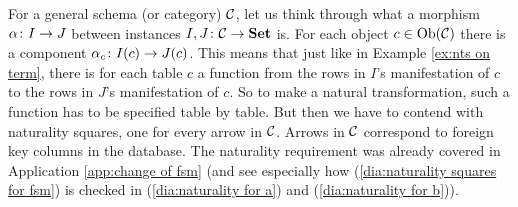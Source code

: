 \documentclass[CT4S-EN-RU]{subfiles}
\begin{document}
\begin{exerciseRUS}\label{exc:indexed sets as functors}
\end{exerciseRUS}

\begin{blockENG}
For a general schema (or category) $\mathcal{C}$, let us think through what a morphism $\alpha\colon I\rightarrow J$ between instances $I,J\colon\mathcal{C}\rightarrow{\bf Set}$ is. For each object $c\in\textnormal{Ob}(\mathcal{C})$ there is a component $\alpha_c\colon I(c)\rightarrow J(c)$. This means that just like in Example \ref{ex:nts on term}, there is for each table $c$ a function from the rows in $I$'s manifestation of $c$ to the rows in $J$'s manifestation of $c$. So to make a natural transformation, such a function has to be specified table by table. But then we have to contend with naturality squares, one for every arrow in $\mathcal{C}$. Arrows in $\mathcal{C}$ correspond to foreign key columns in the database. The naturality requirement was already covered in Application \ref{app:change of fsm} (and see especially how (\ref{dia:naturality squares for fsm}) is checked in (\ref{dia:naturality for a}) and (\ref{dia:naturality for b})).
\end{blockENG}

\begin{blockRUS}
\end{blockRUS}
\end{document}
